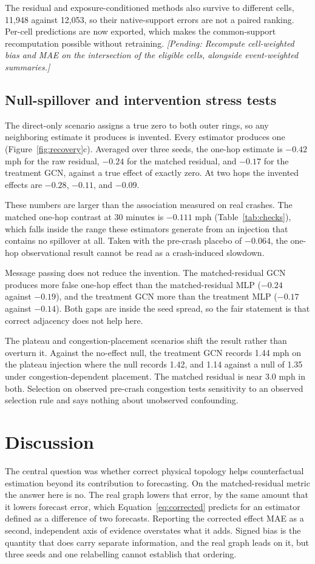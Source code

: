 \documentclass[sigconf,nonacm]{acmart}
\newcommand{\pending}[1]{\textcolor{pendinggray}{\textit{[Pending: #1]}}}
\begin{document}
The residual and exposure-conditioned methods also survive to different cells, 11,948 against 12,053, so their native-support errors are not a paired ranking. Per-cell predictions are now exported, which makes the common-support recomputation possible without retraining. \pending{Recompute cell-weighted bias and MAE on the intersection of the eligible cells, alongside event-weighted summaries.}

\subsection{Null-spillover and intervention stress tests}
The direct-only scenario assigns a true zero to both outer rings, so any neighboring estimate it produces is invented. Every estimator produces one (Figure~\ref{fig:recovery}c). Averaged over three seeds, the one-hop estimate is $-0.42$ mph for the raw residual, $-0.24$ for the matched residual, and $-0.17$ for the treatment GCN, against a true effect of exactly zero. At two hops the invented effects are $-0.28$, $-0.11$, and $-0.09$.

These numbers are larger than the association measured on real crashes. The matched one-hop contrast at 30 minutes is $-0.111$ mph (Table~\ref{tab:checks}), which falls inside the range these estimators generate from an injection that contains no spillover at all. Taken with the pre-crash placebo of $-0.064$, the one-hop observational result cannot be read as a crash-induced slowdown.

Message passing does not reduce the invention. The matched-residual GCN produces more false one-hop effect than the matched-residual MLP ($-0.24$ against $-0.19$), and the treatment GCN more than the treatment MLP ($-0.17$ against $-0.14$). Both gaps are inside the seed spread, so the fair statement is that correct adjacency does not help here.

The plateau and congestion-placement scenarios shift the result rather than overturn it. Against the no-effect null, the treatment GCN records 1.44 mph on the plateau injection where the null records 1.42, and 1.14 against a null of 1.35 under congestion-dependent placement. The matched residual is near 3.0 mph in both. Selection on observed pre-crash congestion tests sensitivity to an observed selection rule and says nothing about unobserved confounding.

\section{Discussion}
The central question was whether correct physical topology helps counterfactual estimation beyond its contribution to forecasting. On the matched-residual metric the answer here is no. The real graph lowers that error, by the same amount that it lowers forecast error, which Equation~\eqref{eq:corrected} predicts for an estimator defined as a difference of two forecasts. Reporting the corrected effect MAE as a second, independent axis of evidence overstates what it adds. Signed bias is the quantity that does carry separate information, and the real graph leads on it, but three seeds and one relabelling cannot establish that ordering.
\end{document}

